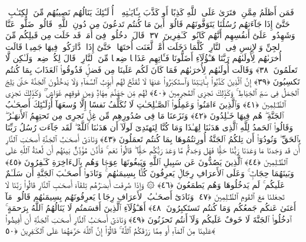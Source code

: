  فَمَن أَظلَمُ مِمَّنِ ٱفتَرَىٰ عَلَى ٱللَّهِ كَذِبًا أَو كَذَّبَ بِـَٔايَـٰتِهِۦٓ ۚ أُو۟لَـٰٓئِكَ يَنَالُهُم نَصِيبُهُم مِّنَ ٱلكِتَـٰبِ ۖ حَتَّىٰٓ إِذَا جَآءَتهُم رُسُلُنَا يَتَوَفَّونَهُم قَالُوٓا۟ أَينَ مَا كُنتُم تَدعُونَ مِن دُونِ ٱللَّهِ ۖ قَالُوا۟ ضَلُّوا۟ عَنَّا وَشَهِدُوا۟ عَلَىٰٓ أَنفُسِهِم أَنَّهُم كَانُوا۟ كَـٰفِرِينَ ﴿٣٧﴾
 قَالَ ٱدخُلُوا۟ فِىٓ أُمَمٍۢ قَد خَلَت مِن قَبلِكُم مِّنَ ٱلجِنِّ وَٱلإِنسِ فِى ٱلنَّارِ ۖ كُلَّمَا دَخَلَت أُمَّةٌۭ لَّعَنَت أُختَهَا ۖ حَتَّىٰٓ إِذَا ٱدَّارَكُوا۟ فِيهَا جَمِيعًۭا قَالَت أُخرَىٰهُم لِأُولَىٰهُم رَبَّنَا هَـٰٓؤُلَآءِ أَضَلُّونَا فَـَٔاتِهِم عَذَابًۭا ضِعفًۭا مِّنَ ٱلنَّارِ ۖ قَالَ لِكُلٍّۢ ضِعفٌۭ وَلَـٰكِن لَّا تَعلَمُونَ ﴿٣٨﴾
 وَقَالَت أُولَىٰهُم لِأُخرَىٰهُم فَمَا كَانَ لَكُم عَلَينَا مِن فَضلٍۢ فَذُوقُوا۟ ٱلعَذَابَ بِمَا كُنتُم تَكسِبُونَ ﴿٣٩﴾
 إِنَّ ٱلَّذِينَ كَذَّبُوا۟ بِـَٔايَـٰتِنَا وَٱستَكبَرُوا۟ عَنهَا لَا تُفَتَّحُ لَهُم أَبوَٟبُ ٱلسَّمَآءِ وَلَا يَدخُلُونَ ٱلجَنَّةَ حَتَّىٰ يَلِجَ ٱلجَمَلُ فِى سَمِّ ٱلخِيَاطِ ۚ وَكَذَٟلِكَ نَجزِى ٱلمُجرِمِينَ ﴿٤٠﴾
 لَهُم مِّن جَهَنَّمَ مِهَادٌۭ وَمِن فَوقِهِم غَوَاشٍۢ ۚ وَكَذَٟلِكَ نَجزِى ٱلظَّـٰلِمِينَ ﴿٤١﴾
 وَٱلَّذِينَ ءَامَنُوا۟ وَعَمِلُوا۟ ٱلصَّـٰلِحَـٰتِ لَا نُكَلِّفُ نَفسًا إِلَّا وُسعَهَآ أُو۟لَـٰٓئِكَ أَصحَـٰبُ ٱلجَنَّةِ ۖ هُم فِيهَا خَـٰلِدُونَ ﴿٤٢﴾
 وَنَزَعنَا مَا فِى صُدُورِهِم مِّن غِلٍّۢ تَجرِى مِن تَحتِهِمُ ٱلأَنهَـٰرُ ۖ وَقَالُوا۟ ٱلحَمدُ لِلَّهِ ٱلَّذِى هَدَىٰنَا لِهَـٰذَا وَمَا كُنَّا لِنَهتَدِىَ لَولَآ أَن هَدَىٰنَا ٱللَّهُ ۖ لَقَد جَآءَت رُسُلُ رَبِّنَا بِٱلحَقِّ ۖ وَنُودُوٓا۟ أَن تِلكُمُ ٱلجَنَّةُ أُورِثتُمُوهَا بِمَا كُنتُم تَعمَلُونَ ﴿٤٣﴾
 وَنَادَىٰٓ أَصحَـٰبُ ٱلجَنَّةِ أَصحَـٰبَ ٱلنَّارِ أَن قَد وَجَدنَا مَا وَعَدَنَا رَبُّنَا حَقًّۭا فَهَل وَجَدتُّم مَّا وَعَدَ رَبُّكُم حَقًّۭا ۖ قَالُوا۟ نَعَم ۚ فَأَذَّنَ مُؤَذِّنٌۢ بَينَهُم أَن لَّعنَةُ ٱللَّهِ عَلَى ٱلظَّـٰلِمِينَ ﴿٤٤﴾
 ٱلَّذِينَ يَصُدُّونَ عَن سَبِيلِ ٱللَّهِ وَيَبغُونَهَا عِوَجًۭا وَهُم بِٱلءَاخِرَةِ كَـٰفِرُونَ ﴿٤٥﴾
 وَبَينَهُمَا حِجَابٌۭ ۚ وَعَلَى ٱلأَعرَافِ رِجَالٌۭ يَعرِفُونَ كُلًّۢا بِسِيمَىٰهُم ۚ وَنَادَوا۟ أَصحَـٰبَ ٱلجَنَّةِ أَن سَلَـٰمٌ عَلَيكُم ۚ لَم يَدخُلُوهَا وَهُم يَطمَعُونَ ﴿٤٦﴾
 ۞ وَإِذَا صُرِفَت أَبصَـٰرُهُم تِلقَآءَ أَصحَـٰبِ ٱلنَّارِ قَالُوا۟ رَبَّنَا لَا تَجعَلنَا مَعَ ٱلقَومِ ٱلظَّـٰلِمِينَ ﴿٤٧﴾
 وَنَادَىٰٓ أَصحَـٰبُ ٱلأَعرَافِ رِجَالًۭا يَعرِفُونَهُم بِسِيمَىٰهُم قَالُوا۟ مَآ أَغنَىٰ عَنكُم جَمعُكُم وَمَا كُنتُم تَستَكبِرُونَ ﴿٤٨﴾
 أَهَـٰٓؤُلَآءِ ٱلَّذِينَ أَقسَمتُم لَا يَنَالُهُمُ ٱللَّهُ بِرَحمَةٍ ۚ ٱدخُلُوا۟ ٱلجَنَّةَ لَا خَوفٌ عَلَيكُم وَلَآ أَنتُم تَحزَنُونَ ﴿٤٩﴾
 وَنَادَىٰٓ أَصحَـٰبُ ٱلنَّارِ أَصحَـٰبَ ٱلجَنَّةِ أَن أَفِيضُوا۟ عَلَينَا مِنَ ٱلمَآءِ أَو مِمَّا رَزَقَكُمُ ٱللَّهُ ۚ قَالُوٓا۟ إِنَّ ٱللَّهَ حَرَّمَهُمَا عَلَى ٱلكَـٰفِرِينَ ﴿٥٠﴾
